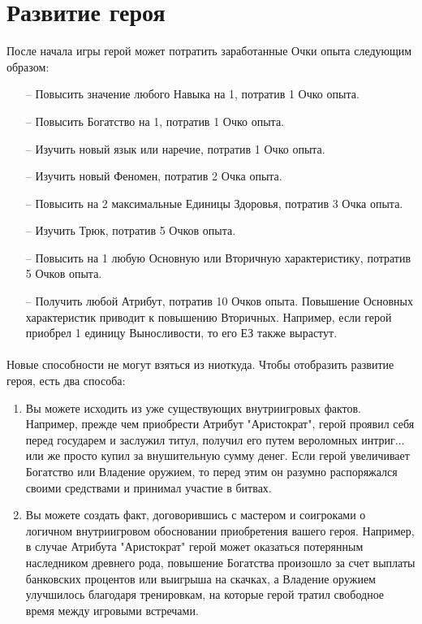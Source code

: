 \section{Развитие героя}
После начала игры герой может потратить заработанные Очки опыта следующим образом:
\begin{itemize}
\item[--] Повысить значение любого Навыка на 1, потратив 1 Очко опыта.
\item[--] Повысить Богатство на 1, потратив 1 Очко опыта.
\item[--] Изучить новый язык или наречие, потратив 1 Очко опыта.
\item[--] Изучить новый Феномен, потратив 2 Очка опыта.
\item[--] Повысить на 2 максимальные Единицы Здоровья, потратив 3 Очка опыта.
\item[--] Изучить Трюк, потратив 5 Очков опыта.
\item[--] Повысить на 1 любую Основную или Вторичную характеристику, потратив 5 Очков опыта.
\item[--] Получить любой Атрибут, потратив 10 Очков опыта.
Повышение Основных характеристик приводит к повышению Вторичных. Например, если герой приобрел 1 единицу Выносливости, то его ЕЗ также вырастут.
\end{itemize}
\paragraph{}
Новые способности не могут взяться из ниоткуда. Чтобы отобразить развитие героя, есть два способа:
\begin{enumerate}
\item Вы можете исходить из уже существующих внутриигровых фактов. Например, прежде чем приобрести Атрибут "Аристократ", герой проявил себя перед государем и заслужил титул, получил его путем вероломных интриг... или же просто купил за внушительную сумму денег. Если герой увеличивает Богатство или Владение оружием, то перед этим он разумно распоряжался своими средствами и принимал участие в битвах.
\item Вы можете создать факт, договорившись с мастером и соигроками о логичном внутриигровом обосновании приобретения вашего героя. Например, в случае Атрибута "Аристократ" герой может оказаться потерянным наследником древнего рода, повышение Богатства произошло за счет выплаты банковских процентов или выигрыша на скачках, а Владение оружием улучшилось благодаря тренировкам, на которые герой тратил свободное время между игровыми встречами.
\end{enumerate}